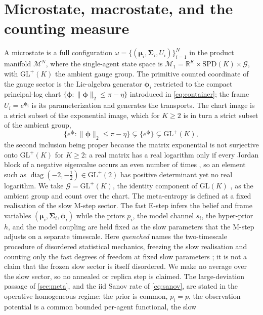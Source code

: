 \documentclass[11pt]{article}
\theoremstyle{plain}
\theoremstyle{definition}
\newcommand{\R}{\mathbb{R}}
\newcommand{\GL}{\mathrm{GL}}
\newcommand{\SPD}{\mathrm{SPD}}
\newcommand{\diag}{\operatorname{diag}}
\newcommand{\bmu}{\boldsymbol{\mu}}
\newcommand{\bSigma}{\boldsymbol{\Sigma}}
\newcommand{\bphi}{\boldsymbol{\phi}}
\newcommand{\Mcal}{\mathcal{M}}
\newcommand{\Gcal}{\mathcal{G}}
\begin{document}
\section{Microstate, macrostate, and the counting measure}
\label{sec:measure}

A microstate is a full configuration
$\omega=\{(\bmu_i,\bSigma_i,U_i)\}_{i=1}^{N}$ in the product manifold $\Mcal^{N}$, where
the single-agent state space is $\Mcal_1=\R^{K}\times\SPD(K)\times\Gcal$, with
$\GL^{+}(K)$ the ambient gauge group. The primitive counted coordinate of the gauge
sector is the Lie-algebra generator $\bphi_i$ restricted to the compact principal-log
chart $\{\bphi:\|\bphi\|_2\le\pi-\eta\}$ introduced in \cref{eq:container}; the frame
$U_i=e^{\bphi_i}$ is its parameterization and generates the transports. The chart image
is a strict subset of the exponential image, which for $K\ge2$ is in turn a strict subset of the
ambient group,
\begin{equation}
\label{eq:nesting}
\{e^{\bphi}:\|\bphi\|_2\le\pi-\eta\}\subsetneq\{e^{\bphi}\}\subsetneq\GL^{+}(K),
\end{equation}
the second inclusion being proper because the matrix exponential is not surjective onto
$\GL^{+}(K)$ for $K\ge2$: a real matrix has a real logarithm only if every Jordan block of
a negative eigenvalue occurs an even number of times \citep{culver1966existence}, so an
element such as $\diag(-2,-\tfrac12)\in\GL^{+}(2)$ has positive determinant yet no real
logarithm. We take $\Gcal=\GL^{+}(K)$, the identity component of $\GL(K)$ \citep{hall2015lie}, as the ambient group and count over the chart. The meta-entropy is defined at a fixed realisation of the slow M-step
sector. The fast E-step infers the belief and frame variables
$(\bmu_i,\bSigma_i,\bphi_i)$ while the priors $p_i$, the model channel $s_i$, the
hyper-prior $h$, and the model coupling are held fixed as the slow parameters that
the M-step adjusts on a separate timescale. Here \emph{quenched} names the
two-timescale procedure of disordered statistical mechanics, freezing the slow
realisation and counting only the fast degrees of freedom at fixed slow parameters
\citep{mezard1987spin}; it is not a claim that the frozen slow sector is itself
disordered. We make no average over the slow sector, so no annealed or replica step
is claimed. The large-deviation passage of \cref{sec:meta}, and the iid Sanov rate of
\cref{eq:sanov}, are stated in the operative homogeneous regime: the prior is common,
$p_i=p$, the observation potential is a common bounded per-agent functional, the slow
\end{document}
